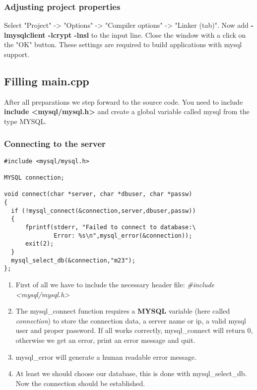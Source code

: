 \subsubsection{Adjusting project properties}
Select "Project" -> "Options" -> "Compiler options" -> "Linker (tab)".
Now add \textbf{-lmysqlclient -lcrypt -lnsl} to the input line. Close the window with a click on the "OK" button. These settings are required to build applications with mysql support.

\subsection{Filling main.cpp}
After all preparations we step forward to the source code. You need to include \textbf{include <mysql/mysql.h>} and create a global variable called mysql from the type MYSQL.

\subsubsection{Connecting to the server}
\begin{verbatim}
#include <mysql/mysql.h>

MYSQL connection;

void connect(char *server, char *dbuser, char *passw)
{
  if (!mysql_connect(&connection,server,dbuser,passw))
  {
      fprintf(stderr, "Failed to connect to database:\
              Error: %s\n",mysql_error(&connection));
      exit(2);
  }
  mysql_select_db(&connection,"m23");
};
\end{verbatim}
\begin{enumerate}
\item First of all we have to include the necessary header file: \textit{\#include <mysql/mysql.h>}
\item The mysql\_connect function requires a \textbf{MYSQL} variable (here called
\textit{connection}) to store the connection data, a server name or ip, a valid mysql user and proper password. If all works correctly, mysql\_connect will return 0, otherwise we get an error, print an error message and quit.

\item mysql\_error will generate a human readable error message.

\item At least we should choose our database, this is done with mysql\_select\_db. Now the connection should be established.

\end{enumerate}






